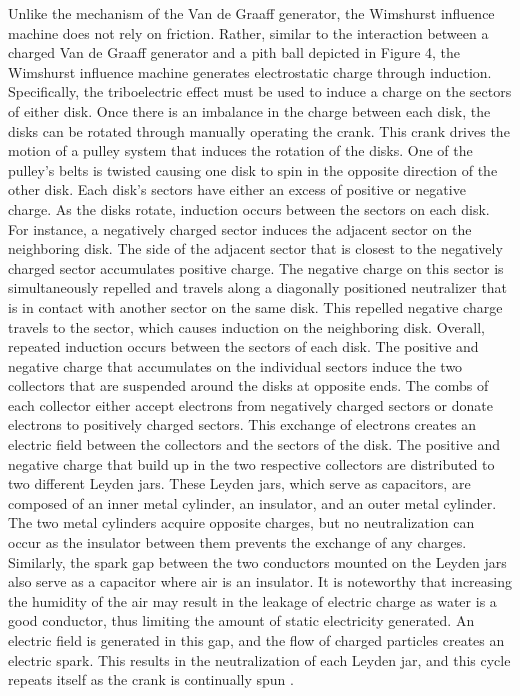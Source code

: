 \documentclass[12pt]{amsart}
\begin{document}
\indent Unlike the mechanism of the Van de Graaff generator, the Wimshurst influence machine does not rely on friction. Rather, similar to the interaction between a charged Van de Graaff generator and a pith ball depicted in Figure 4, the Wimshurst influence machine generates electrostatic charge through induction. Specifically, the triboelectric effect must be used to induce a charge on the sectors of either disk. Once there is an imbalance in the charge between each disk, the disks can be rotated through manually operating the crank. This crank drives the motion of a pulley system that induces the rotation of the disks. One of the pulley’s belts is twisted causing one disk to spin in the opposite direction of the other disk. Each disk’s sectors have either an excess of positive or negative charge. As the disks rotate, induction occurs between the sectors on each disk. For instance, a negatively charged sector induces the adjacent sector on the neighboring disk. The side of the adjacent sector that is closest to the negatively charged sector accumulates positive charge. The negative charge on this sector is simultaneously repelled and travels along a diagonally positioned neutralizer that is in contact with another sector on the same disk. This repelled negative charge travels to the sector, which causes induction on the neighboring disk. Overall, repeated induction occurs between the sectors of each disk. The positive and negative charge that accumulates on the individual sectors induce the two collectors that are suspended around the disks at opposite ends. The combs of each collector either accept electrons from negatively charged sectors or donate electrons to positively charged sectors. This exchange of electrons creates an electric field between the collectors and the sectors of the disk. The positive and negative charge that build up in the two respective collectors are distributed to two different Leyden jars. These Leyden jars, which serve as capacitors, are composed of an inner metal cylinder, an insulator, and an outer metal cylinder. The two metal cylinders acquire opposite charges, but no neutralization can occur as the insulator between them prevents the exchange of any charges. Similarly, the spark gap between the two conductors mounted on the Leyden jars also serve as a capacitor where air is an insulator. It is noteworthy that increasing the humidity of the air may result in the leakage of electric charge as water is a good conductor, thus limiting the amount of static electricity generated. An electric field is generated in this gap, and the flow of charged particles creates an electric spark. This results in the neutralization of each Leyden jar, and this cycle repeats itself as the crank is continually spun \cite{rim}. \\
\end{document}
